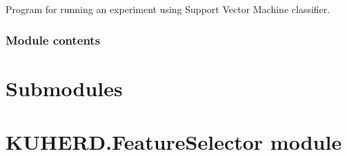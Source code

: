 \documentclass[letterpaper,10pt,english]{sphinxmanual}
\begin{document}
\begin{fulllineitems}
\label{\detokenize{KUHERD.Experiments:KUHERD.Experiments.MultiSVM.MultiSVM}}
Program for running an experiment using Support Vector Machine classifier.

\end{fulllineitems}



\subsubsection{Module contents}
\label{\detokenize{KUHERD.Experiments:module-KUHERD.Experiments}}\label{\detokenize{KUHERD.Experiments:module-contents}}

\section{Submodules}
\label{\detokenize{KUHERD:submodules}}

\section{KUHERD.FeatureSelector module}
\label{\detokenize{KUHERD:module-KUHERD.FeatureSelector}}\label{\detokenize{KUHERD:kuherd-featureselector-module}}
\end{document}
